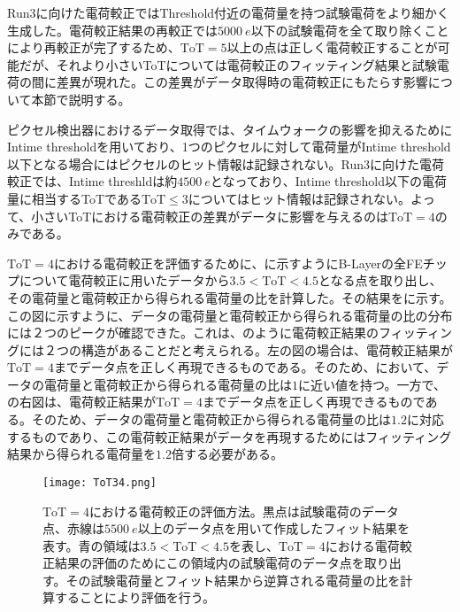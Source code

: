Run3に向けた電荷較正ではThreshold付近の電荷量を持つ試験電荷をより細かく生成した。電荷較正結果の再較正では$5000\ \si{e}$以下の試験電荷を全て取り除くことにより再較正が完了するため、$\mathrm{ToT}=5$以上の点は正しく電荷較正することが可能だが、それより小さいToTについては電荷較正のフィッティング結果と試験電荷の間に差異が現れた。この差異がデータ取得時の電荷較正にもたらす影響について本節で説明する。

ピクセル検出器におけるデータ取得では、タイムウォークの影響を抑えるためにIntime thresholdを用いており、1つのピクセルに対して電荷量がIntime threshold以下となる場合にはピクセルのヒット情報は記録されない。Run3に向けた電荷較正では、Intime threshldは約$4500\ \si{e}$となっており、Intime threshold以下の電荷量に相当するToTである$\mathrm{ToT}\leq3$についてはヒット情報は記録されない。よって、小さいToTにおける電荷較正の差異がデータに影響を与えるのは$\mathrm{ToT}=4$のみである。

$\mathrm{ToT}=4$における電荷較正を評価するために、に示すようにB-Layerの全FEチップについて電荷較正に用いたデータから$3.5 < \mathrm{ToT} < 4.5$となる点を取り出し、その電荷量と電荷較正から得られる電荷量の比を計算した。その結果をに示す。この図に示すように、データの電荷量と電荷較正から得られる電荷量の比の分布には２つのピークが確認できた。これは、のように電荷較正結果のフィッティングには２つの構造があることだと考えられる。左の図の場合は、電荷較正結果が$\mathrm{ToT}=4$までデータ点を正しく再現できるものである。そのため、において、データの電荷量と電荷較正から得られる電荷量の比は$1$に近い値を持つ。一方で、の右図は、電荷較正結果が$\mathrm{ToT}=4$までデータ点を正しく再現できるものである。そのため、データの電荷量と電荷較正から得られる電荷量の比は$1.2$に対応するものであり、この電荷較正結果がデータを再現するためにはフィッティング結果から得られる電荷量を$1.2$倍する必要がある。

\begin{figure}[tbp]
  \centering
  \texttt{[image: ToT34.png]}
  \caption[$\mathrm{ToT}=4$における電荷較正の評価方法]{$\mathrm{ToT}=4$における電荷較正の評価方法。黒点は試験電荷のデータ点、赤線は$5500\ \si{e}$以上のデータ点を用いて作成したフィット結果を表す。青の領域は$3.5 < \mathrm{ToT} < 4.5$を表し、$\mathrm{ToT}=4$における電荷較正結果の評価のためにこの領域内の試験電荷のデータ点を取り出す。その試験電荷量とフィット結果から逆算される電荷量の比を計算することにより評価を行う。}
  \label{fig:totsmall}
\end{figure}

